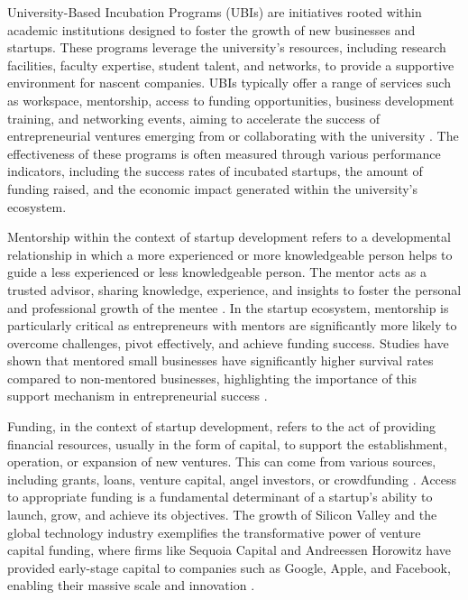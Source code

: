 \documentclass[../Main.tex]{subfiles}
\begin{document}
University-Based Incubation Programs (UBIs) are initiatives rooted within academic institutions designed to foster the growth of new businesses and startups. These programs leverage the university's resources, including research facilities, faculty expertise, student talent, and networks, to provide a supportive environment for nascent companies. UBIs typically offer a range of services such as workspace, mentorship, access to funding opportunities, business development training, and networking events, aiming to accelerate the success of entrepreneurial ventures emerging from or collaborating with the university \cite{grimaldi2005university, siegel2003assessing}. The effectiveness of these programs is often measured through various performance indicators, including the success rates of incubated startups, the amount of funding raised, and the economic impact generated within the university's ecosystem.

Mentorship within the context of startup development refers to a developmental relationship in which a more experienced or more knowledgeable person helps to guide a less experienced or less knowledgeable person. The mentor acts as a trusted advisor, sharing knowledge, experience, and insights to foster the personal and professional growth of the mentee \cite{jacobi1991mentorship, nationalacademies2019mentoring}. In the startup ecosystem, mentorship is particularly critical as entrepreneurs with mentors are significantly more likely to overcome challenges, pivot effectively, and achieve funding success. Studies have shown that mentored small businesses have significantly higher survival rates compared to non-mentored businesses, highlighting the importance of this support mechanism in entrepreneurial success \cite{kauffman2013mentoring}.

Funding, in the context of startup development, refers to the act of providing financial resources, usually in the form of capital, to support the establishment, operation, or expansion of new ventures. This can come from various sources, including grants, loans, venture capital, angel investors, or crowdfunding \cite{bruneel2010funding, lerner2018venture}. Access to appropriate funding is a fundamental determinant of a startup's ability to launch, grow, and achieve its objectives. The growth of Silicon Valley and the global technology industry exemplifies the transformative power of venture capital funding, where firms like Sequoia Capital and Andreessen Horowitz have provided early-stage capital to companies such as Google, Apple, and Facebook, enabling their massive scale and innovation \cite{lerner2012venture}.
\end{document}
